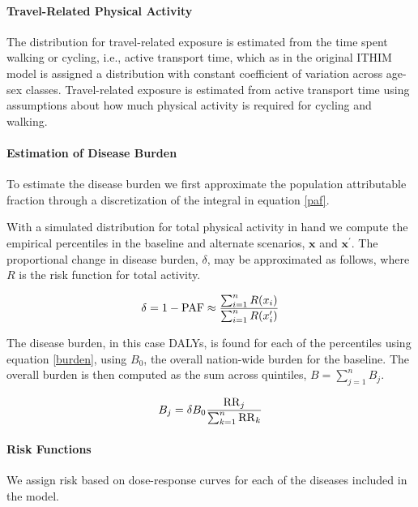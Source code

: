 \paragraph{Travel-Related Physical Activity}

The distribution for travel-related exposure is estimated from the
time spent walking or cycling, i.e., active transport time, which as
in the original ITHIM model is assigned a \logNormal{} distribution
with constant coefficient of variation across age-sex classes.
Travel-related exposure is estimated from active transport time using
assumptions about how much physical activity is required for cycling
and walking.

\paragraph{Estimation of Disease Burden}

To estimate the disease burden we first approximate the population
attributable fraction through a discretization of the integral in
equation \ref{paf}.


With a simulated distribution for total physical activity in hand we
compute the empirical percentiles in the baseline and alternate
scenarios, $\mathbf{x}$ and $\mathbf{x}^\prime$. The proportional
change in disease burden, $\delta$, may be approximated as follows,
where $R$ is the risk function for total activity.

\begin{equation}
\delta = 1 - \mathrm{PAF} \approx \frac{\sum_{i=1}^n R(x_i)}{\sum_{i=1}^n R(x_i^\prime)}
\end{equation}

The disease burden, in this case DALYs, is found for each of the
percentiles using equation \ref{burden}, using $B_0$, the overall nation-wide burden for
the baseline.  The overall burden is then computed as the sum across
quintiles, $B=\sum_{j=1}^n B_j$.

\begin{equation}
B_j = \delta B_0\frac{\mathrm{RR}_j}{\sum_{k=1}^n \mathrm{RR}_k}\label{burden}
\end{equation}

\paragraph{Risk Functions}

We assign risk based on dose-response curves for each of the diseases
included in the model.

